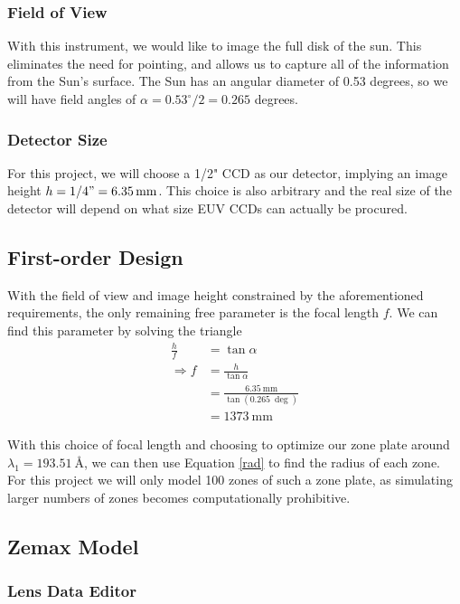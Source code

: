 \documentclass[10pt,letterpaper]{article}
\begin{document}
			\subsubsection{Field of View}
			
				With this instrument, we would like to image the full disk of the sun. This eliminates the need for pointing, and allows us to capture all of the information from the Sun's surface. The Sun has an angular diameter of 0.53 degrees, so we will have field angles of $\alpha = 0.53^\circ / 2 = 0.265$ degrees.
				
			\subsubsection{Detector Size}
			
				For this project, we will choose a 1/2" CCD as our detector, implying an image height $h = 1/4" = \SI{6.35}{\milli \meter}$. This choice is also arbitrary and the real size of the detector will depend on what size EUV CCDs can actually be procured.
			
		\subsection{First-order Design}
		
			With the field of view and image height constrained by the aforementioned requirements, the only remaining free parameter is the focal length $f$. We can find this parameter by solving the triangle
			\begin{align}
				\frac{h}{f} &= \tan \alpha \\
				\Rightarrow f &= \frac{h}{\tan \alpha} \\
				&= \frac{\SI{6.35}{\milli \meter}}{\tan(\SI{0.265}{\deg})} \\
				&= \SI{1373}{\milli \meter}
			\end{align}
			
			With this choice of focal length and choosing to optimize our zone plate around $\lambda_1 = \SI{193.51}{\angstrom}$, we can then use Equation \ref{rad} to find the radius of each zone. For this project we will only model 100 zones of such a zone plate, as simulating larger numbers of zones becomes computationally prohibitive.
		
		\subsection{Zemax Model}
			\subsubsection{Lens Data Editor}
			
\end{document}
